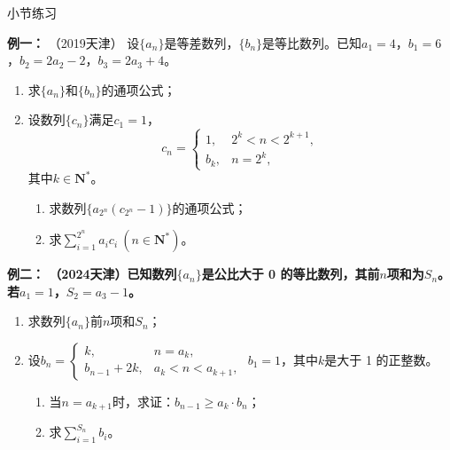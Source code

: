 \documentclass{article}
\begin{document}
\begin{center}
    小节练习
\end{center}


\noindent\textbf{例一： }（2019天津）
设$\{a_n\}$是等差数列，$\{b_n\}$是等比数列。已知$a_1=4$，$b_1=6$，$b_2=2a_2-2$，$b_3=2a_3+4$。

\begin{enumerate}[label=(\Roman*)]
    \item 求$\{a_n\}$和$\{b_n\}$的通项公式；
    
    \item 设数列$\{c_n\}$满足$c_1=1$，
    \[
    c_n =
    \begin{cases}
    1, & 2^k < n < 2^{k+1}, \\
    b_k, & n = 2^k,
    \end{cases}
    \]
    其中$k\in\mathbf{N}^*$。
    
    \begin{enumerate}[label=(\roman*)]
        \item 求数列$\{a_{2^n}(c_{2^n}-1)\}$的通项公式；
        \item 求$\displaystyle\sum_{i=1}^{2^n} a_i c_i\ (n\in\mathbf{N}^*)$。
    \end{enumerate}
\end{enumerate}
\vspace{15\baselineskip}

\noindent\textbf{例二： （2024天津）已知数列$\{a_n\}$是公比大于 0 的等比数列，其前$n$项和为$S_n$。若$a_1=1$，$S_2=a_3-1$。}

\begin{enumerate}[label=(\Roman*)]
    \item 求数列$\{a_n\}$前$n$项和$S_n$；
    
    \item 设$b_n =
    \begin{cases}
    k, & n = a_k, \\
    b_{n-1} + 2k, & a_k < n < a_{k+1},
    \end{cases}$
    $b_1=1$，其中$k$是大于 1 的正整数。
    
    \begin{enumerate}[label=(\roman*)]
        \item 当$n = a_{k+1}$时，求证：$b_{n-1} \ge a_k \cdot b_n$；
        \item 求$\displaystyle\sum_{i=1}^{S_n} b_i$。
    \end{enumerate}
\end{enumerate}
\end{document}
